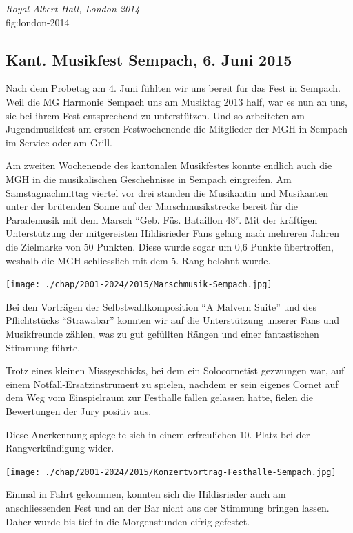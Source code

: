 {\emph{Royal Albert Hall, London 2014}\\
} {fig:london-2014}


\subsection*{Kant. Musikfest Sempach, 6. Juni 2015}

\begin{history}


    Nach dem Probetag am 4. Juni fühlten wir uns bereit für das Fest in Sempach.
    Weil die MG Harmonie Sempach uns am Musiktag 2013 half, war es nun an uns,
    sie bei ihrem Fest entsprechend zu unterstützen. Und so arbeiteten am
    Jugendmusikfest am ersten Festwochenende die Mitglieder der MGH in Sempach
    im Service oder am Grill.

    Am zweiten Wochenende des kantonalen Musikfestes konnte endlich auch die MGH
    in die musikalischen Geschehnisse in Sempach eingreifen. Am
    Samstagnachmittag viertel vor drei standen die Musikantin und Musikanten
    unter der brütenden Sonne auf der Marschmusikstrecke bereit für die
    Parademusik mit dem Marsch \enquote{Geb. Füs. Bataillon 48}. Mit der
    kräftigen Unterstützung der mitgereisten Hildisrieder Fans gelang nach
    mehreren Jahren die Zielmarke von 50 Punkten. Diese wurde sogar um 0,6
    Punkte übertroffen, weshalb die MGH schliesslich mit dem 5. Rang belohnt
    wurde.

    \begin{MulticolFigure}
        \centering
        \texttt{[image: ./chap/2001-2024/2015/Marschmusik-Sempach.jpg]}
    \end{MulticolFigure}

    Bei den Vorträgen der Selbstwahlkomposition \enquote{A Malvern Suite} und
    des Pflichtstücks \enquote{Strawabar} konnten wir auf die Unterstützung
    unserer Fans und Musikfreunde zählen, was zu gut gefüllten Rängen und einer
    fantastischen Stimmung führte.

    Trotz eines kleinen Missgeschicks, bei dem ein Solocornetist gezwungen war,
    auf einem Notfall-Ersatzinstrument zu spielen, nachdem er sein eigenes
    Cornet auf dem Weg vom Einspielraum zur Festhalle fallen gelassen hatte,
    fielen die Bewertungen der Jury positiv aus.

    Diese Anerkennung spiegelte sich in einem erfreulichen 10. Platz bei der
    Rangverkündigung wider.

    \begin{MulticolFigure}
        \centering
        \texttt{[image: ./chap/2001-2024/2015/Konzertvortrag-Festhalle-Sempach.jpg]}
    \end{MulticolFigure}

    Einmal in Fahrt gekommen, konnten sich die Hildisrieder auch am
    anschliessenden Fest und an der Bar nicht aus der Stimmung bringen lassen.
    Daher wurde bis tief in die Morgenstunden eifrig gefestet.

\end{history}



